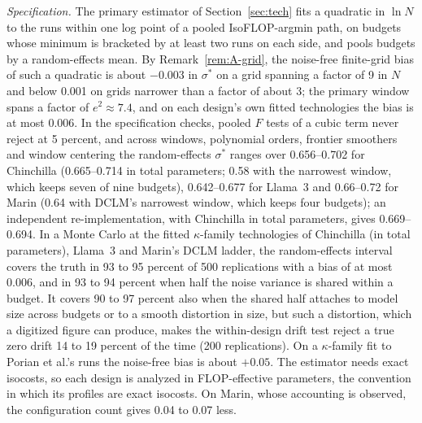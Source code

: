 \textit{Specification.} The primary estimator of Section~\ref{sec:tech} fits a quadratic in $\ln N$ to the runs within one
log point of a pooled IsoFLOP-argmin path, on budgets whose minimum is bracketed by at least two runs on each side, and
pools budgets by a random-effects mean. By Remark~\ref{rem:A-grid}, the noise-free finite-grid bias of such a quadratic is
about $-0.003$ in $\sigma^*$ on a grid spanning a factor of 9 in $N$ and below 0.001 on grids narrower than a factor of
about 3; the primary window spans a factor of $e^2\approx7.4$, and on each design's own fitted technologies the bias is
at most 0.006. In the specification checks, pooled $F$ tests of a cubic term never reject at 5 percent, and across
windows, polynomial orders, frontier smoothers and window centering the random-effects $\sigma^*$ ranges over
0.656--0.702 for Chinchilla (0.665--0.714 in total parameters; 0.58 with the narrowest window, which keeps seven of nine
budgets), 0.642--0.677 for Llama~3 and 0.66--0.72 for Marin (0.64 with DCLM's narrowest window, which keeps four
budgets); an independent re-implementation, with Chinchilla in total parameters, gives 0.669--0.694. In a Monte Carlo at
the fitted $\kappa$-family technologies of Chinchilla (in total parameters), Llama~3 and Marin's DCLM ladder, the
random-effects interval covers the truth in 93 to 95 percent of 500 replications with a bias of at most 0.006, and in
93 to 94 percent when half the noise variance is shared within a budget. It covers 90 to 97 percent also when the
shared half attaches to model size across budgets or to a smooth distortion in size, but such a distortion, which a
digitized figure can produce, makes the within-design drift test reject a true zero drift 14 to 19 percent of the time
(200 replications). On a $\kappa$-family fit to Porian et al.'s runs the noise-free bias is about $+0.05$. The estimator needs exact isocosts, so each design is analyzed in FLOP-effective parameters, the
convention in which its profiles are exact isocosts. On Marin, whose accounting is observed, the configuration count
gives 0.04 to 0.07 less.

